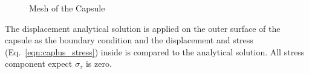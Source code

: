 \begin{figure}[h!]
    \centering
    \begin{subfigure}[b]{1\linewidth}
        \centering
    \end{subfigure}
    \begin{subfigure}[b]{1\linewidth}
        \centering
    \end{subfigure}
    \caption{Mesh of the Capsule}
    \label{oct_fig:ex_caplus_mesh1.png}
\end{figure}
%
The displacement analytical solution \citep{Tim1951} is applied on the outer surface of the capsule as the boundary condition and the displacement and stress (Eq.~\ref{eqn:caplus_stress}) inside is compared to the analytical solution.
All stress component expect $\sigma_z$ is zero.

